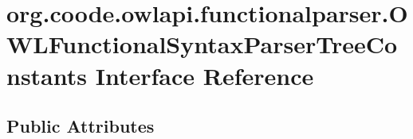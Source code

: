 \hypertarget{interfaceorg_1_1coode_1_1owlapi_1_1functionalparser_1_1_o_w_l_functional_syntax_parser_tree_constants}{\section{org.\-coode.\-owlapi.\-functionalparser.\-O\-W\-L\-Functional\-Syntax\-Parser\-Tree\-Constants Interface Reference}
\label{interfaceorg_1_1coode_1_1owlapi_1_1functionalparser_1_1_o_w_l_functional_syntax_parser_tree_constants}
}
\subsection*{Public Attributes}
